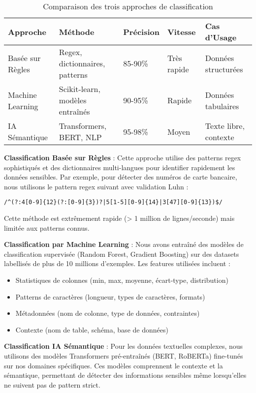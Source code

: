 \begin{table}[htpb]
\centering
\caption{Comparaison des trois approches de classification}
\label{tab:approches_classification}
\begin{tabular}{|p{}|p{}|p{}|p{}|p{}|}
\hline
\textbf{Approche} & \textbf{Méthode} & \textbf{Précision} & \textbf{Vitesse} & \textbf{Cas d'Usage} \\
\hline
Basée sur Règles & Regex, dictionnaires, patterns & 85-90\% & Très rapide & Données structurées \\
\hline
Machine Learning & Scikit-learn, modèles entraînés & 90-95\% & Rapide & Données tabulaires \\
\hline
IA Sémantique & Transformers, BERT, NLP & 95-98\% & Moyen & Texte libre, contexte \\
\hline
\end{tabular}
\end{table}

\textbf{Classification Basée sur Règles} : Cette approche utilise des patterns regex sophistiqués et des dictionnaires multi-langues pour identifier rapidement les données sensibles. Par exemple, pour détecter des numéros de carte bancaire, nous utilisons le pattern regex suivant avec validation Luhn :

\texttt{/\^{}(?:4[0-9]\{12\}(?:[0-9]\{3\})?|5[1-5][0-9]\{14\}|3[47][0-9]\{13\})\$/}

Cette méthode est extrêmement rapide (> 1 million de lignes/seconde) mais limitée aux patterns connus.

\textbf{Classification par Machine Learning} : Nous avons entraîné des modèles de classification supervisée (Random Forest, Gradient Boosting) sur des datasets labellisés de plus de 10 millions d'exemples. Les features utilisées incluent :
\begin{itemize}
    \item Statistiques de colonnes (min, max, moyenne, écart-type, distribution)
    \item Patterns de caractères (longueur, types de caractères, formats)
    \item Métadonnées (nom de colonne, type de données, contraintes)
    \item Contexte (nom de table, schéma, base de données)
\end{itemize}

\textbf{Classification IA Sémantique} : Pour les données textuelles complexes, nous utilisons des modèles Transformers pré-entraînés (BERT, RoBERTa) fine-tunés sur nos domaines spécifiques. Ces modèles comprennent le contexte et la sémantique, permettant de détecter des informations sensibles même lorsqu'elles ne suivent pas de pattern strict.

